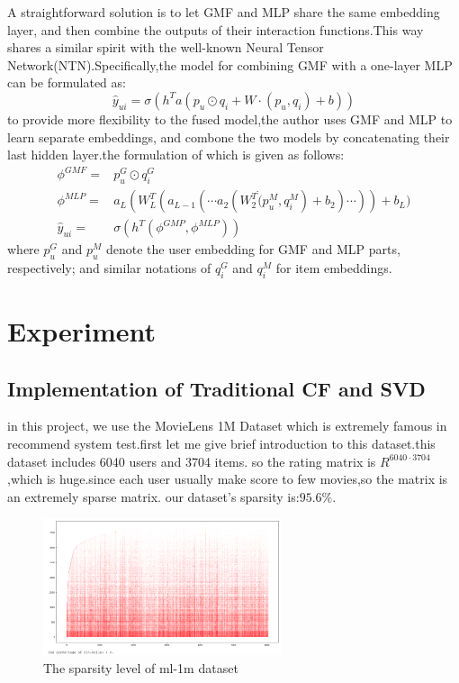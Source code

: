 \documentclass{acmtog} %
\begin{document}
A straightforward solution is to let GMF and MLP share the same embedding layer, and then combine the outputs of their interaction functions.This way shares a similar spirit with the well-known Neural Tensor Network(NTN).Specifically,the model for combining GMF with a one-layer MLP can be formulated as:
\begin{equation}
	\hat y_{ui}=\sigma(h^T a(p_u\odot q_i+W\cdot(p_u,q_i)+b))
\end{equation}
to provide more flexibility to the fused model,the author uses GMF and MLP to learn separate embeddings, and combone the two models by concatenating their last hidden layer.the formulation of which is given as follows:
\begin{equation}
\begin{aligned}
	\phi ^{GMF}=&p_u^G\odot q_i^G\\
	\phi ^{MLP}=&a_L(W_L^T(a_{L-1}(\cdots a_2(W_2^T\dot(p_u^M,q_i^M)+b_2)\cdots))+b_L)\\
	\hat y_{ui}=&\sigma(h^T(\phi^{GMP},\phi^{MLP}))
\end{aligned}
\end{equation}
where $p^G_u$ and $p^M_u$ denote the user embedding for GMF and MLP parts, respectively; and similar notations of $q^G_i$ and $q^M_i$ for item embeddings.
\section{Experiment}
\subsection{Implementation of Traditional CF and SVD}
in this project, we use the MovieLens 1M Dataset which is extremely famous in recommend system test.first let me give  brief introduction to this  dataset.this dataset includes 6040 users and 3704 items. so the rating matrix is $R^{6040\cdot 3704}$,which is huge.since each user usually make score to few movies,so the matrix is an extremely sparse matrix. our dataset's sparsity is:$95.6\%$.
\begin{figure}[h!]
	\centering
	\includegraphics[width=7cm]{pa6}
	\caption{The  sparsity level of ml-1m dataset}
	\label{fig:pa6}
\end{figure}
\end{document}
